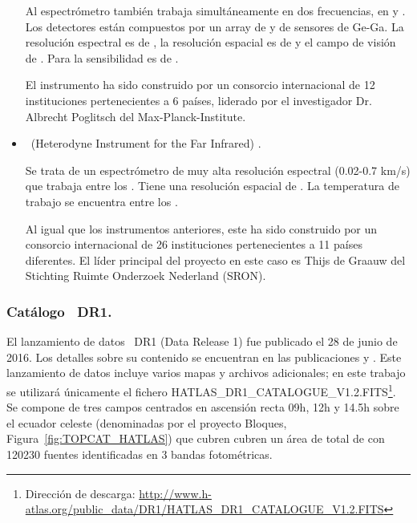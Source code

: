 \begin{itemize}
    Al espectrómetro también trabaja simultáneamente en dos frecuencias, en  y . Los detectores están compuestos por un array de  y de  sensores de Ge-Ga. La resolución espectral es de , la resolución espacial es de  y el campo de visión de . Para  la sensibilidad es de .
    
    El instrumento ha sido construido por un consorcio internacional de 12 instituciones pertenecientes a 6 países, liderado por el investigador Dr. Albrecht Poglitsch del Max-Planck-Institute\citep{website:h_instrumets}.
    
    
    \item \hifi\ (Heterodyne Instrument for the Far Infrared) \citep{website:hifi_website}.
    
    Se trata de un espectrómetro de muy alta resolución espectral (0.02-0.7 km/s) que trabaja entre los . Tiene una resolución espacial de . La temperatura de trabajo se encuentra entre los .
    
    Al igual que los instrumentos anteriores, este ha sido construido por un consorcio internacional de 26 instituciones pertenecientes a 11 países diferentes. El líder principal del proyecto en este caso es Thijs de Graauw del Stichting Ruimte Onderzoek Nederland (SRON)\citep{website:h_instrumets}.


\end{itemize}

\subsubsection{Catálogo \hatlas\ DR1.}\label{subsec:catalogo_hatlas}

El lanzamiento de datos \hatlas\ DR1 (Data Release 1) fue publicado el 28 de junio de 2016. Los detalles sobre su contenido se encuentran en las publicaciones \cite{article:valiente_2016} y
\cite{article:bourne_2016}. Este lanzamiento de datos incluye varios mapas y archivos adicionales; en este trabajo se utilizará únicamente el fichero {\small HATLAS\_DR1\_CATALOGUE\_V1.2.FITS}\footnote{Dirección de descarga: \url{http://www.h-atlas.org/public_data/DR1/HATLAS_DR1_CATALOGUE_V1.2.FITS}}.
Se compone de tres campos centrados en ascensión recta 09h, 12h y 14.5h sobre el ecuador celeste (denominadas por el proyecto Bloques, Figura~\ref{fig:TOPCAT_HATLAS}) que cubren cubren un área de total de   con 120230 fuentes identificadas en 3 bandas fotométricas.

